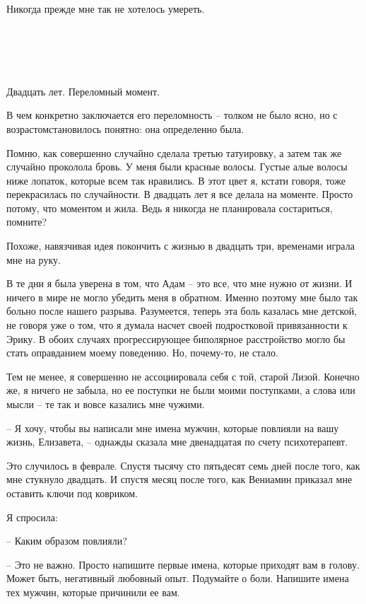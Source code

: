 \documentclass[
]{book}
\begin{document}
Никогда прежде мне так не хотелось умереть.

\hypertarget{chapter-89}{%
\chapter{~}\label{chapter-89}}

Двадцать лет. Переломный момент.

В чем конкретно заключается его переломность -- толком не было ясно, но с возрастомстановилось понятно: она определенно была.

Помню, как совершенно случайно сделала третью татуировку, а затем так же случайно проколола бровь. У меня были красные волосы. Густые алые волосы ниже лопаток, которые всем так нравились. В этот цвет я, кстати говоря, тоже перекрасилась по случайности. В двадцать лет я все делала на моменте. Просто потому, что моментом и жила. Ведь я никогда не планировала состариться, помните?

Похоже, навязчивая идея покончить с жизнью в двадцать три, временами играла мне на руку.

В те дни я была уверена в том, что Адам -- это все, что мне нужно от жизни. И ничего в мире не могло убедить меня в обратном. Именно поэтому мне было так больно после нашего разрыва. Разумеется, теперь эта боль казалась мне детской, не говоря уже о том, что я думала насчет своей подростковой привязанности к Эрику. В обоих случаях прогрессирующее биполярное расстройство могло бы стать оправданием моему поведению. Но, почему-то, не стало.

Тем не менее, я совершенно не ассоциировала себя с той, старой Лизой. Конечно же, я ничего не забыла, но ее поступки не были моими поступками, а слова или мысли -- те так и вовсе казались мне чужими.

-- Я хочу, чтобы вы написали мне имена мужчин, которые повлияли на вашу жизнь, Елизавета, -- однажды сказала мне двенадцатая по счету психотерапевт.

Это случилось в феврале. Спустя тысячу сто пятьдесят семь дней после того, как мне стукнуло двадцать. И спустя месяц после того, как Вениамин приказал мне оставить ключи под ковриком.

Я спросила:

-- Каким образом повлияли?

-- Это не важно. Просто напишите первые имена, которые приходят вам в голову. Может быть, негативный любовный опыт. Подумайте о боли. Напишите имена тех мужчин, которые причинили ее вам.
\end{document}
